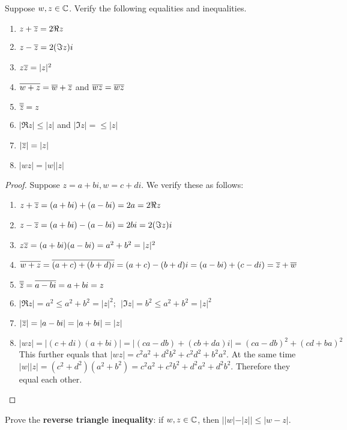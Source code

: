 \documentclass{extarticle}
\begin{document}
\newpage 

\begin{problem}{1}
    Suppose \(w, z \in \mathbb{C}\). Verify the following equalities and inequalities. 
    \begin{enumerate}[label=(\alph*)]
        \item \(z + \overline{z} = 2 \Re z\) 
        \item \(z - \overline{z} = 2 (\Im z)i\)  
        \item \(z \overline{z} = |z|^2\) 
        \item \(\overline{w + z} = \overline{w} + \overline{z}\) and \(\overline{wz} = \overline{w} \overline{z}\) 
        \item \(\overline{\overline{z}} = z\) 
        \item \(|\Re z| \leq |z|\) and \(|\Im z|= \leq |z|\)
        \item \(|\overline{z}| = |z|\) 
        \item \(|wz| = |w| |z|\)
    \end{enumerate}
\end{problem}

\begin{proof}
Suppose \(z = a + bi, w = c + di\). We verify these as follows:
\begin{enumerate}[label=(\alph*)]
    \item \(z + \overline{z} = (a+bi) + (a-bi) = 2a = 2\Re z\)
    \item \(z - \overline{z} = (a+bi) - (a-bi) = 2bi = 2 (\Im z)i\)
    \item \(z\overline{z} = (a+bi)(a-bi)= a^2 + b^2 = |z|^2\)
    \item \(\overline{w+z} = \overline{(a+c)+(b+d)i} = (a+c) - (b+d)i = (a-bi)+(c-di) = \overline{z} + \overline{w}\)
    \item \(\overline{\overline{z}}=\overline{a-bi}=a+bi = z\)
    \item \(|\Re z| = a^2 \leq a^2 + b^2 = |z|^2;\ \ |\Im z| = b^2 \leq a^2 + b^2 = |z|^2\)
    \item \(|\overline{z}| = |a-bi| = |a+bi| = |z|\) 
    \item \(|wz| = |(c+di)(a+bi)| = | (ca - db) + (cb + da)i| = (ca - db)^2 + (cd + ba)^2\)
    This further equals that  \(|wz| = c^2a^2 +d^2b^2 + c^2d^2 + b^2a^2\).
    At the same time \(|w||z| = (c^2 + d^2)(a^2 + b^2) = c^2 a^2 + c^2 b^2 + d^2 a^2 + d^2 b^2\).
    Therefore they equal each other.
\end{enumerate}
\end{proof}

\begin{problem}{2}
    Prove the \textbf{reverse triangle inequality}: if \(w, z \in \mathbb{C}\), then 
    \(||w| - |z| | \leq |w - z|\). 
\end{problem}
\end{document}
